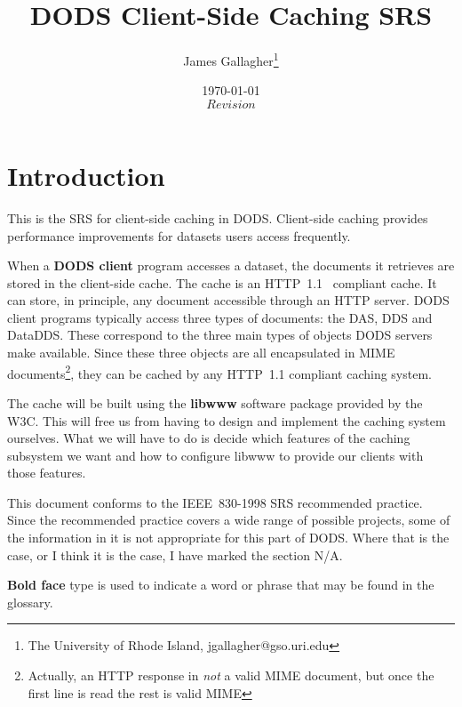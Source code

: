 \documentclass{article}
\begin{document}
\title{DODS Client-Side Caching SRS}
\author{James Gallagher\thanks{The University of Rhode Island,
    jgallagher@gso.uri.edu}}
\date{\today \\ $Revision$ }



\maketitle
\tableofcontents

\section{Introduction}

This is the \ac{SRS} for client-side caching in \acs{DODS}. Client-side
caching provides performance improvements for datasets users access
frequently.

When a \textbf{DODS client} program accesses a
dataset, the documents it retrieves are stored in the client-side cache. The
cache is an \acs{HTTP}~1.1~\cite{w3c:http} compliant cache. It can store, in
principle, any document accessible through an HTTP server. DODS client
programs typically access three types of documents: the \acs{DAS}, \acs{DDS}
and \acs{DataDDS}. These correspond to the three main types of objects DODS
servers make available. Since these three objects are all encapsulated in
\acs{MIME}~\cite{rfc:mime} documents\footnote{Actually, an HTTP response in
  \emph{not} a valid MIME document, but once the first line is read the rest
  is valid MIME}, they can be cached by any HTTP~1.1 compliant caching
system.
  
The cache will be built using the \textbf{libwww} software
package provided by the \ac{W3C}. This will free us from having to design and
implement the caching system ourselves. What we will have to do is decide
which features of the caching subsystem we want and how to configure libwww
to provide our clients with those features.

This document conforms to the IEEE~830-1998 \ac{SRS} recommended practice.
Since the recommended practice covers a wide range of possible projects, some
of the information in it is not appropriate for this part of \acs{DODS}.
Where that is the case, or I think it is the case, I have marked the section
N/A.

\textbf{Bold face} type is used to indicate a word or phrase that may be
found in the glossary.
\end{document}
